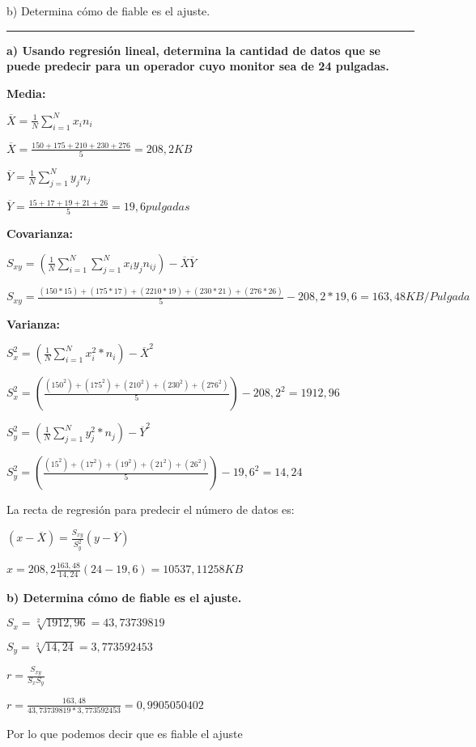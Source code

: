 \documentclass{article}
\begin{document}
b) Determina c\'omo de fiable es el ajuste.

\rule{119mm}{0.2mm}

\textbf{a) Usando regresi\'on lineal, determina la cantidad de datos que se puede predecir para un operador cuyo monitor sea de 24 pulgadas.}
 
 \textbf{Media:}

\(\overline{X} = \frac{1}{N} \displaystyle\sum_{i=1}^{N} x_{i} n_{i}\)

\(\overline{X} = \frac{150 + 175 + 210 + 230 + 276}{5} = 208,2 KB\)

\(\overline{Y} = \frac{1}{N} \displaystyle\sum_{j=1}^{N} y_{j} n_{j}\)

\(\overline{Y} = \frac{15 + 17 + 19 + 21 + 26}{5} = 19,6 pulgadas\)

\textbf{Covarianza:}


\(S_{xy} = (\frac{1}{N} \displaystyle\sum_{i=1}^{N} \displaystyle\sum_{j=1}^{N} x_{i} y_{j} n_{ij}) - \overline{X} \overline{Y}\)

\(S_{xy} = \frac{(150 * 15) + (175 * 17) + (2210 * 19) + (230 * 21) + (276 * 26)}{5} - 208,2 * 19,6 = 163,48 KB/Pulgada\)

\textbf{Varianza:}

\(S_{x}^2  = (\frac{1}{N} \displaystyle\sum_{i=1}^{N} x_{i} ^2 * n_{i}) - \overline{X}^2\)

\(S_{x}^2 = (\frac{(150^2) + (175^2) + (210^2) + (230^2) + (276^2) }{5}) - 208,2^2 = 1912,96\)

\(S_{y}^2  = (\frac{1}{N} \displaystyle\sum_{j=1}^{N} y_{j} ^2 * n_{j}) - \overline{Y}^2\)

\(S_{y}^2 = (\frac{(15^2) + (17^2) + (19^2) + (21^2) + (26^2) }{5}) - 19,6^2 = 14,24\)

La recta de regresi\'on para predecir el n\'umero de datos es:

\((x - \overline{X}) = \frac{S_{xy}}{S_{y}^2} (y- \overline{Y})\)

\(x = 208,2 \frac{163,48}{14,24} (24 - 19,6) = 10537,11258 KB\)
 
 \textbf{b) Determina c\'omo de fiable es el ajuste.}

\(S_{x} = \sqrt[2]{1912,96} = 43,73739819\)

\(S_{y} = \sqrt[2]{14,24} = 3,773592453\)

\(r = \frac{S_{xy}}{S_{x} S_{y}}\)

\(r = \frac{163,48}{43,73739819 * 3,773592453} = 0,9905050402 \)

Por lo que podemos decir que es fiable el ajuste
\end{document}
